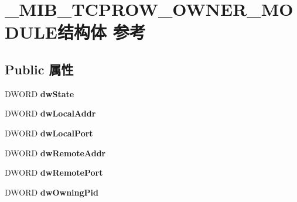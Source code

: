 \hypertarget{struct___m_i_b___t_c_p_r_o_w___o_w_n_e_r___m_o_d_u_l_e}{}\section{\+\_\+\+M\+I\+B\+\_\+\+T\+C\+P\+R\+O\+W\+\_\+\+O\+W\+N\+E\+R\+\_\+\+M\+O\+D\+U\+L\+E结构体 参考}
\label{struct___m_i_b___t_c_p_r_o_w___o_w_n_e_r___m_o_d_u_l_e}
\subsection*{Public 属性}
\begin{DoxyCompactItemize}
\item 
\mbox{\label{struct___m_i_b___t_c_p_r_o_w___o_w_n_e_r___m_o_d_u_l_e_a4d570d589194eff209f476bbdaf044ab}} 
D\+W\+O\+RD {\bfseries dw\+State}
\item 
\mbox{\label{struct___m_i_b___t_c_p_r_o_w___o_w_n_e_r___m_o_d_u_l_e_a7c0f140a78bc71da9f27908606f3538f}} 
D\+W\+O\+RD {\bfseries dw\+Local\+Addr}
\item 
\mbox{\label{struct___m_i_b___t_c_p_r_o_w___o_w_n_e_r___m_o_d_u_l_e_a5d3bf2f863bdb6d101cb2bad8ddccff0}} 
D\+W\+O\+RD {\bfseries dw\+Local\+Port}
\item 
\mbox{\label{struct___m_i_b___t_c_p_r_o_w___o_w_n_e_r___m_o_d_u_l_e_aedfd1e48f546e0c2f59e6f41468bffdd}} 
D\+W\+O\+RD {\bfseries dw\+Remote\+Addr}
\item 
\mbox{\label{struct___m_i_b___t_c_p_r_o_w___o_w_n_e_r___m_o_d_u_l_e_ae49549b1ebdb9d25b01928353e0f25cf}} 
D\+W\+O\+RD {\bfseries dw\+Remote\+Port}
\item 
\mbox{\label{struct___m_i_b___t_c_p_r_o_w___o_w_n_e_r___m_o_d_u_l_e_afe27c0eb33973a25b5f3462817d78815}} 
D\+W\+O\+RD {\bfseries dw\+Owning\+Pid}
\item 

\end{DoxyCompactItemize}
